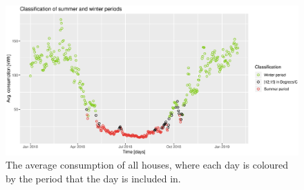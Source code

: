 \begin{figure}[ht]
    \centering
    \includegraphics[scale=0.55]{../../../figures/class_breakpoint.eps}
    \caption{The average consumption of all houses, where each day is coloured by the period that the day is included in.}
    \label{fig: class_break_point}
\end{figure}
